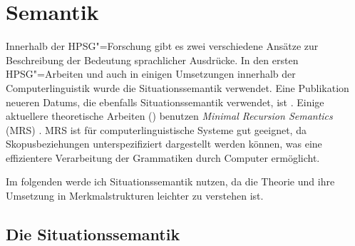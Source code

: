
\chapter{Semantik}
\label{chap-sem}


Innerhalb der HPSG"=Forschung gibt es zwei verschiedene Ansätze
zur Beschreibung der Bedeutung sprachlicher Ausdrücke. In den ersten
HPSG"=Arbeiten \citep{ps,ps2,Mueller99a} und auch in einigen Umsetzungen 
innerhalb der Computerlinguistik wurde die Situationssemantik
\citep*{BP83a,CMP90,Devlin92}\nocite{BP87a} verwendet.
Eine Publikation neueren Datums, die ebenfalls Situationssemantik verwendet,
ist .
Einige aktuellere theoretische Arbeiten (\zb {}) benutzen
\emph{Minimal Recursion Semantics}
(MRS) \citep*{CFPS2005a}. MRS ist für computerlinguistische Systeme gut geeignet, da
Skopusbeziehungen unterspezifiziert dargestellt werden können, was eine effizientere
Verarbeitung der Grammatiken durch Computer ermöglicht.

Im folgenden werde ich Situationssemantik nutzen, da die Theorie und ihre
Umsetzung in Merkmalstrukturen leichter zu verstehen ist.

\section{Die Situationssemantik}

